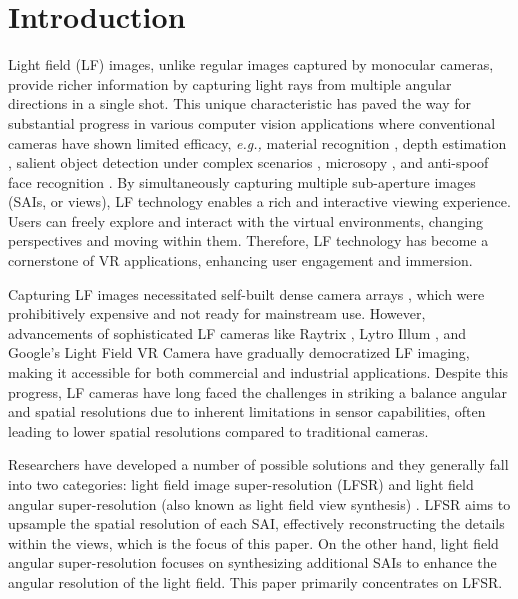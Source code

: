 \section{Introduction} \label{section:Introduction}

Light field (LF) images, unlike regular images captured by monocular cameras, provide richer information by capturing light rays from multiple angular directions in a single shot. This unique characteristic has paved the way for substantial progress in various computer vision applications where conventional cameras have shown limited efficacy, \textit{e.g.,} material recognition \cite{wangLFRecognition_ECCV2016, luLFRecognition_2019}, depth estimation \cite{yucer2016efficient, heberUshapeICCV2017, wangOcclusionawareDepthEstimation2015, chaoSubFocal_TCI2023, ding_TCI2023}, salient object detection under complex scenarios \cite{shengLFSaliency_ICASSP2016, zhangLFNet_TIP2020, chen_TMM2023}, microsopy \cite{verinaz_TCI2022, verinaz_TCI2023, levoy2006light}, and anti-spoof face recognition \cite{raghavendraLFFace_TIP2015, jiLFHOG_ICIP2016}. By simultaneously capturing multiple sub-aperture images (SAIs, or views), LF technology enables a rich and interactive viewing experience. Users can freely explore and interact with the virtual environments, changing perspectives and moving within them. Therefore, LF technology has become a cornerstone of VR applications, enhancing user engagement and immersion.




Capturing LF images necessitated self-built dense camera arrays \cite{wilburn2004high, wilburn2005high}, which were prohibitively expensive and not ready for mainstream use. However, advancements of sophisticated LF cameras like Raytrix \cite{Raytrix}, Lytro Illum \cite{Lytro}, and Google's Light Field VR Camera \cite{GoogleLF} have gradually democratized LF imaging, making it accessible for both commercial and industrial applications. Despite this progress, LF cameras have long faced the challenges in striking a balance angular and spatial resolutions due to inherent limitations in sensor capabilities, often leading to lower spatial resolutions compared to traditional cameras.

Researchers have developed a number of possible solutions and they generally fall into two categories: light field image super-resolution (LFSR) \cite{yeungSAS_LFSR2019,wangDistgSSR_TIP2022} and light field angular super-resolution (also known as light field view synthesis) \cite{liu_TMM2022, yeungSAS_ECCV2018}. LFSR aims to upsample the spatial resolution of each SAI, effectively reconstructing the details within the views, which is the focus of this paper. On the other hand, light field angular super-resolution focuses on synthesizing additional SAIs to enhance the angular resolution of the light field. This paper primarily concentrates on LFSR.

